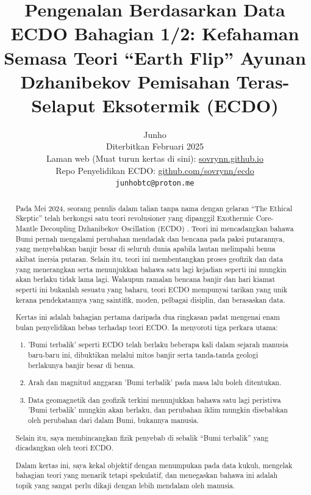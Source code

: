 \documentclass[10pt,twocolumn,letterpaper]{article}
\begin{document}
\title{Pengenalan Berdasarkan Data ECDO Bahagian 1/2: Kefahaman Semasa Teori “Earth Flip” Ayunan Dzhanibekov Pemisahan Teras-Selaput Eksotermik (ECDO)}

\author{Junho\\
Diterbitkan Februari 2025\\
Laman web (Muat turun kertas di sini): \href{https://sovrynn.github.io}{sovrynn.github.io}\\
Repo Penyelidikan ECDO: \href{https://github.com/sovrynn/ecdo}{github.com/sovrynn/ecdo}\\
{\tt\small junhobtc@proton.me}
}
\maketitle

\begin{abstract}
Pada Mei 2024, seorang penulis dalam talian tanpa nama dengan gelaran “The Ethical Skeptic” \cite{0} telah berkongsi satu teori revolusioner yang dipanggil Exothermic Core-Mantle Decoupling Dzhanibekov Oscillation (ECDO) \cite{1}. Teori ini mencadangkan bahawa Bumi pernah mengalami perubahan mendadak dan bencana pada paksi putarannya, yang menyebabkan banjir besar di seluruh dunia apabila lautan melimpahi benua akibat inersia putaran. Selain itu, teori ini membentangkan proses geofizik dan data yang menerangkan serta menunjukkan bahawa satu lagi kejadian seperti ini mungkin akan berlaku tidak lama lagi. Walaupun ramalan bencana banjir dan hari kiamat seperti ini bukanlah sesuatu yang baharu, teori ECDO mempunyai tarikan yang unik kerana pendekatannya yang saintifik, moden, pelbagai disiplin, dan berasaskan data.

Kertas ini adalah bahagian pertama daripada dua ringkasan padat mengenai enam bulan penyelidikan bebas \cite{2,20} terhadap teori ECDO. Ia menyoroti tiga perkara utama:

\begin{flushleft}
\begin{enumerate}
    \item 'Bumi terbalik' seperti ECDO telah berlaku beberapa kali dalam sejarah manusia baru-baru ini, dibuktikan melalui mitos banjir serta tanda-tanda geologi berlakunya banjir besar di benua.
    \item Arah dan magnitud anggaran 'Bumi terbalik' pada masa lalu boleh ditentukan.
    \item Data geomagnetik dan geofizik terkini menunjukkan bahawa satu lagi peristiwa 'Bumi terbalik' mungkin akan berlaku, dan perubahan iklim mungkin disebabkan oleh perubahan dari dalam Bumi, bukannya manusia.
\end{enumerate}
\end{flushleft}

Selain itu, saya membincangkan fizik penyebab di sebalik “Bumi terbalik” yang dicadangkan oleh teori ECDO.

Dalam kertas ini, saya kekal objektif dengan menumpukan pada data kukuh, mengelak bahagian teori yang menarik tetapi spekulatif, dan menegaskan bahawa ini adalah topik yang sangat perlu dikaji dengan lebih mendalam oleh manusia.
\end{abstract}
\end{document}
